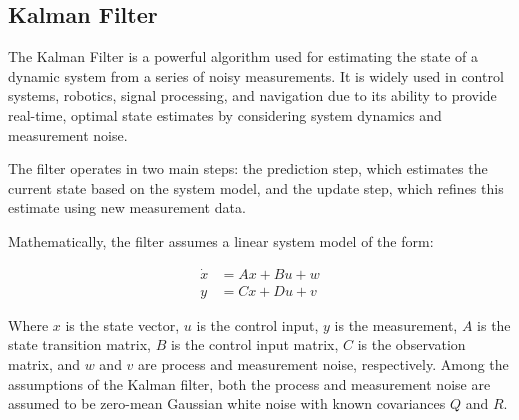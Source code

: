 \subsection{Kalman Filter}
\label{sec:kalman_filter}





The Kalman Filter is a powerful algorithm used for estimating the state of a dynamic system from a series of noisy measurements.
It is widely used in control systems, robotics, signal processing, and navigation due to its ability to provide real-time, optimal state estimates by considering system dynamics and measurement noise.

The filter operates in two main steps: the prediction step, which estimates the current state based on the system model, and the update step, which refines this estimate using new measurement data.


Mathematically, the filter assumes a linear system model of the form:

\begin{equation}
    \begin{aligned}
        \dot{x} & = A x + B u + w \\
        y       & = C x + D u + v
    \end{aligned}
\end{equation}

Where $x$ is the state vector, $u$ is the control input, $y$ is the measurement, $A$ is the state transition matrix, $B$ is the control input matrix, $C$ is the observation matrix, and $w$ and $v$ are process and measurement noise, respectively.
Among the assumptions of the Kalman filter, both the process and measurement noise are assumed to be zero-mean Gaussian white noise with known covariances $Q$ and $R$.


